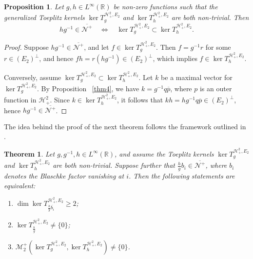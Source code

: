 \documentclass[12pt,a4paper]{amsart}
\newtheorem{theorem}{Theorem}[section]
\newtheorem{Proposition}[Definition]{Proposition}
\begin{document}
\begin{Proposition}\label{thm1}
Let \( g, h \in L^\infty(\mathbb{R}) \) be non-zero functions such that the generalized Toeplitz kernels \( \ker T_g^{\mathcal{H}^2_+, E_2} \) and \( \ker T_h^{\mathcal{H}^2_+, E_2} \) are both non-trivial. Then
\[
hg^{-1} \in \overline{\mathcal{N}^+} \quad \Longleftrightarrow \quad \ker T_g^{\mathcal{H}^2_+, E_2} \subset \ker T_h^{\mathcal{H}^2_+, E_2}.
\]
\end{Proposition}

\begin{proof}
Suppose \( hg^{-1} \in \overline{\mathcal{N}^+} \), and let \( f \in \ker T_g^{\mathcal{H}^2_+, E_2} \). Then \( f = g^{-1}r \) for some \( r \in (E_2)^\perp \), and hence \( fh = r(hg^{-1}) \in (E_2)^\perp \), which implies \( f \in \ker T_h^{\mathcal{H}^2_+, E_2} \).

Conversely, assume \( \ker T_g^{\mathcal{H}^2_+, E_2} \subset \ker T_h^{\mathcal{H}^2_+, E_2} \). Let \( k \) be a maximal vector for \( \ker T_g^{\mathcal{H}^2_+, E_2} \). By Proposition ~\ref{thm4}, we have \( k = g^{-1}q\overline{p} \), where \( p \) is an outer function in \( \mathcal{H}^2_+ \). Since \( k \in \ker T_h^{\mathcal{H}^2_+, E_2} \), it follows that \( kh = hg^{-1}q\overline{p} \in (E_2)^\perp \), hence \( hg^{-1} \in \overline{\mathcal{N}^+} \).
\end{proof}

The idea behind the proof of the next theorem follows the framework outlined in \cite{FRR18}.

\begin{theorem}\label{thm3}
Let \( g, g^{-1}, h \in L^\infty(\mathbb{R}) \), and assume the Toeplitz kernels \( \ker T_g^{\mathcal{H}^2_+, E_2} \) and \( \ker T_h^{\mathcal{H}^2_+, E_2} \) are both non-trivial. Suppose further that \( \frac{h}{g}b_i \in \overline{\mathcal{N}^+} \), where \( b_i \) denotes the Blaschke factor vanishing at \( i \). Then the following statements are equivalent:
\begin{enumerate}
    \item[\textnormal{(1)}] \( \dim \ker T_{\frac{h}{g} \overline{b_i}}^{\mathcal{H}^2_+, E_2} \geq 2 \);
    \item[\textnormal{(2)}] \( \ker T_{\frac{h}{g}}^{\mathcal{H}^2_+, E_2} \neq \{0\} \);
    \item[\textnormal{(3)}] \( \mathcal{M}_2^+(\ker T_g^{\mathcal{H}^2_+, E_2}, \ker T_h^{\mathcal{H}^2_+, E_2}) \neq \{0\} \).
\end{enumerate}
\end{theorem}
\end{document}
